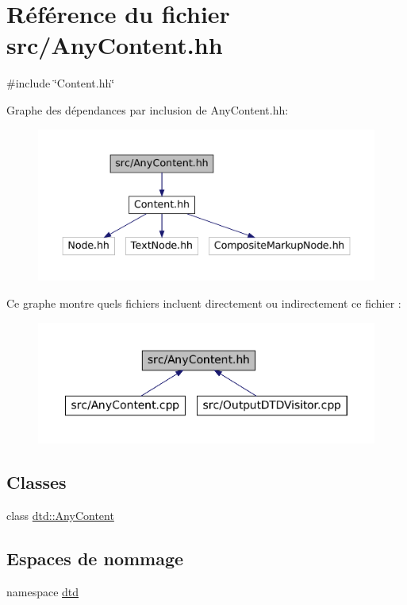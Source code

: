\hypertarget{_any_content_8hh}{
\section{Référence du fichier src/AnyContent.hh}
\label{_any_content_8hh}
}
{\ttfamily \#include \char`\"{}Content.hh\char`\"{}}\par
Graphe des dépendances par inclusion de AnyContent.hh:\nopagebreak
\begin{figure}[H]
\begin{center}
\leavevmode
\includegraphics[width=400pt]{_any_content_8hh__incl}
\end{center}
\end{figure}
Ce graphe montre quels fichiers incluent directement ou indirectement ce fichier :\nopagebreak
\begin{figure}[H]
\begin{center}
\leavevmode
\includegraphics[width=400pt]{_any_content_8hh__dep__incl}
\end{center}
\end{figure}
\subsection*{Classes}
\begin{DoxyCompactItemize}
\item 
class \hyperlink{classdtd_1_1_any_content}{dtd::AnyContent}
\end{DoxyCompactItemize}
\subsection*{Espaces de nommage}
\begin{DoxyCompactItemize}
\item 
namespace \hyperlink{namespacedtd}{dtd}
\end{DoxyCompactItemize}
